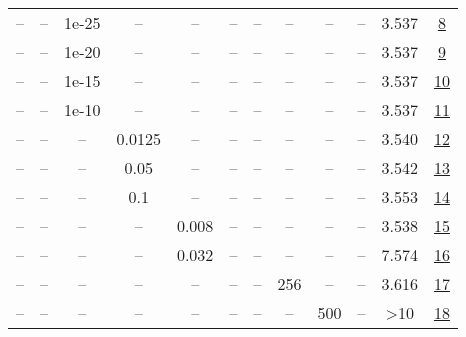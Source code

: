 \begin{table}[H]
\begin{tabular}{cccccccccccc}
-- & -- & 1e-25 & -- & -- & -- & -- & -- & -- & -- & 3.537 & \href{https://wandb.ai/stanford-mercury/optimizer-scaling/runs/sweep-130m-2B-mars692316lr0.016-wd0.1-minlr0-warmup2000-b10.9-b2-93e276}{8} \\
-- & -- & 1e-20 & -- & -- & -- & -- & -- & -- & -- & 3.537 & \href{https://wandb.ai/stanford-mercury/optimizer-scaling/runs/sweep-130m-2B-mars7253f2lr0.016-wd0.1-minlr0-warmup2000-b10.9-b2-9c8165}{9} \\
-- & -- & 1e-15 & -- & -- & -- & -- & -- & -- & -- & 3.537 & \href{https://wandb.ai/stanford-mercury/optimizer-scaling/runs/sweep-130m-2B-mars43bbc9lr0.016-wd0.1-minlr0-warmup2000-b10.9-b2-805b23}{10} \\
-- & -- & 1e-10 & -- & -- & -- & -- & -- & -- & -- & 3.537 & \href{https://wandb.ai/stanford-mercury/optimizer-scaling/runs/sweep-130m-2B-mars2566cflr0.016-wd0.1-minlr0-warmup2000-b10.9-b2-b6fd06}{11} \\
-- & -- & -- & 0.0125 & -- & -- & -- & -- & -- & -- & 3.540 & \href{https://wandb.ai/stanford-mercury/optimizer-scaling/runs/sweep-130m-2B-mars176e13lr0.016-wd0.1-minlr0-warmup2000-b10.9-b2-2cfa05}{12} \\
-- & -- & -- & 0.05 & -- & -- & -- & -- & -- & -- & 3.542 & \href{https://wandb.ai/stanford-mercury/optimizer-scaling/runs/sweep-130m-2B-mars3356c4lr0.016-wd0.1-minlr0-warmup2000-b10.9-b2-e25891}{13} \\
-- & -- & -- & 0.1 & -- & -- & -- & -- & -- & -- & 3.553 & \href{https://wandb.ai/stanford-mercury/optimizer-scaling/runs/sweep-130m-2B-mars29f7d4lr0.016-wd0.1-minlr0-warmup2000-b10.9-b2-723099}{14} \\
-- & -- & -- & -- & 0.008 & -- & -- & -- & -- & -- & 3.538 & \href{https://wandb.ai/stanford-mercury/optimizer-scaling/runs/sweep-130m-2B-mars33a7c2lr0.008-wd0.1-minlr0-warmup2000-b10.9-b2-485319}{15} \\
-- & -- & -- & -- & 0.032 & -- & -- & -- & -- & -- & 7.574 & \href{https://wandb.ai/stanford-mercury/optimizer-scaling/runs/sweep-130m-2B-mars8c1591lr0.032-wd0.1-minlr0-warmup2000-b10.9-b2-8906e2}{16} \\
-- & -- & -- & -- & -- & -- & -- & 256 & -- & -- & 3.616 & \href{https://wandb.ai/stanford-mercury/optimizer-scaling/runs/sweep-130m-2B-marsaf638flr0.016-wd0.1-minlr0-warmup2000-b10.9-b2-184b59}{17} \\
-- & -- & -- & -- & -- & -- & -- & -- & 500 & -- & >10 & \href{https://wandb.ai/stanford-mercury/optimizer-scaling/runs/sweep-130m-2B-marse5556elr0.016-wd0.1-minlr0-warmup500-b10.9-b20-4a1a3f}{18} \\

\end{tabular}
\end{table}
